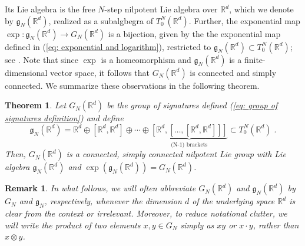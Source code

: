 \documentclass[pdflatex,sn-mathphys-num]{sn-jnl}
\theoremstyle{thmstyletwo}
\theoremstyle{thmstyleone}
\newtheorem{theorem}[definition]{Theorem}
\theoremstyle{thmstyletwo}
\newtheorem{remark}[definition]{Remark}
\newcommand{\fancyg}{\mathfrak{g}}
\newcommand{\R}{\mathbb{R}}
\begin{document}
	Its Lie algebra is the free $N$-step nilpotent Lie algebra over $\R^d$, which we denote by $\fancyg_N(\R^d)$, realized as a subalgbegra of $ T_0^N\left(\mathbb{R}^d\right)$. Further, the exponential map $\exp: \fancyg_N(\R^d) \to G_N(\mathbb{R}^d)$ is a bijection, given by the the exponential map defined in (\ref{eq: exponential and logarithm}), restricted to $\fancyg_N(\R^d) \subset T_0^N\left(\mathbb{R}^d\right)$; see \cite[Theorem~7.30]{friz2010multidimensional}. Note that since $\exp$ is a homeomorphism and $\fancyg_N(\R^d)$ is a finite-dimensional vector space, it follows that $G_N(\mathbb{R}^d)$ is connected and simply connected. We summarize these observations in the following theorem.
	\begin{theorem}\label{thm: GN is group with algebra gn}
		Let $G_N(\mathbb{R}^d)$ be the group of signatures defined (\ref{eq: group of signatures definition}) and define
		\begin{equation*}
			\fancyg_N(\mathbb{R}^d) = \mathbb{R}^d \oplus [\mathbb{R}^d, \mathbb{R}^d] \oplus \cdots \oplus 
			\underbrace{[\mathbb{R}^d, [\ldots, [\mathbb{R}^d, \mathbb{R}^d]]]}_{\text{(N-1) brackets}} \subset T_0^N\left(\mathbb{R}^d\right) \;.
		\end{equation*}
		Then, $G_N(\mathbb{R}^d)$ is a connected, simply connected nilpotent Lie group with Lie algebra $\fancyg_N(\mathbb{R}^d)$ and $\exp(\fancyg_N(\mathbb{R}^d)) = G_N(\mathbb{R}^d)$.
	\end{theorem}
	
	\begin{remark}
		In what follows, we will often abbreviate $G_N(\mathbb{R}^d)$ and $\mathfrak{g}_N(\mathbb{R}^d)$ by $G_N$ and $\mathfrak{g}_N$, respectively, whenever the dimension $d$ of the underlying space $\mathbb{R}^d$ is clear from the context or irrelevant. Moreover, to reduce notational clutter, we will write the product of two elements $x, y \in G_N$ simply as $xy$ or $x \cdot y$, rather than $x \otimes y$.
	\end{remark}
\end{document}
